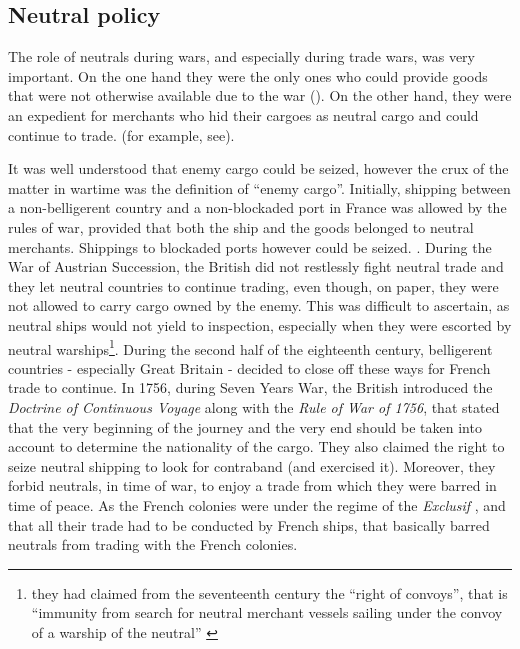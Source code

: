 \documentclass[12pt,a4paper,notitlepage,english]{article}
\begin{document}
\subsection{Neutral policy}

The role of neutrals during wars, and especially during trade wars, was very important. On the one hand they were the only ones who could provide goods that were not otherwise available due to the war (\cite{Hedberg2015}). On the other hand, they were an expedient for merchants who hid their cargoes as neutral cargo and could continue to trade. (for example, see\cite{Carriere1973,Schnakenbourg2013,Schnakenbourg2015}). 

It was well understood that enemy cargo could be seized, however the crux of the matter in wartime was the definition of ``enemy cargo''. 
Initially, shipping between a non-belligerent country and a non-blockaded port in France was allowed by the rules of war, provided that both the ship and the goods belonged to neutral merchants. Shippings to blockaded ports however could be seized. \citep[p. 112]{Schnakenbourg2013}.
During the War of Austrian Succession, the British did not restlessly fight neutral trade and they let neutral countries to continue trading, even though, on paper, they were not allowed to carry cargo owned by the enemy. This was difficult to ascertain, as neutral ships would not yield to inspection, especially when they were escorted by neutral warships\footnote{they had claimed from the seventeenth century the ``right of convoys'', that is ``immunity from search for neutral merchant vessels sailing under the convoy of a warship of the neutral''  \citep{TheEditorsofEncyclopaediaBritannica2014}}.
During the second half of the eighteenth century, belligerent countries - especially Great Britain - decided to close off these ways for French trade to continue. 
In 1756, during Seven Years War, the British introduced the \textit{Doctrine of Continuous Voyage} along with the \textit{Rule of War of 1756}, that stated that the very beginning of the journey and the very end should be taken into account to determine the nationality of the cargo.
They also claimed the right to seize neutral shipping to look for contraband (and exercised it).
Moreover, they forbid neutrals, in time of war, to enjoy a trade from which they were barred in time of peace. As the French colonies were under the regime of the \textit{Exclusif} \citep{Tarrade1972}, and that all their trade had to be conducted by French ships, that basically barred neutrals from trading with the French colonies.
\end{document}
